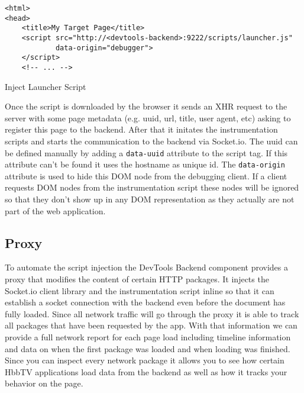 \vspace{0.3cm}
\begin{listing}[H]
\begin{verbatim}
<html>
<head>
    <title>My Target Page</title>
    <script src="http://<devtools-backend>:9222/scripts/launcher.js"
            data-origin="debugger">
    </script>
    <!-- ... -->
\end{verbatim}
\caption{Inject Launcher Script}
\label{lst:launcher}
\end{listing}

Once the script is downloaded by the browser it sends an XHR request to the server with some page metadata (e.g. uuid, url, title, user agent, etc) asking to register this page to the backend. After that it initates the instrumentation scripts and starts the communication to the backend via Socket.io. The uuid can be defined manually by adding a \texttt{data-uuid} attribute to the script tag. If this attribute can't be found it uses the hostname as unique id. The \texttt{data-origin} attribute is used to hide this DOM node from the debugging client. If a client requests DOM nodes from the instrumentation script these nodes will be ignored so that they don't show up in any DOM representation as they actually are not part of the web application.

\subsection{Proxy\label{sec:proxy}}

To automate the script injection the DevTools Backend component provides a proxy that modifies the content of certain HTTP packages. It injects the Socket.io client library and the instrumentation script inline so that it can establish a socket connection with the backend even before the document has fully loaded. Since all network traffic will go through the proxy it is able to track all packages that have been requested by the app. With that information we can provide a full network report for each page load including timeline information and data on when the first package was loaded and when loading was finished. Since you can inspect every network package it allows you to see how certain HbbTV applications load data from the backend as well as how it tracks your behavior on the page.

